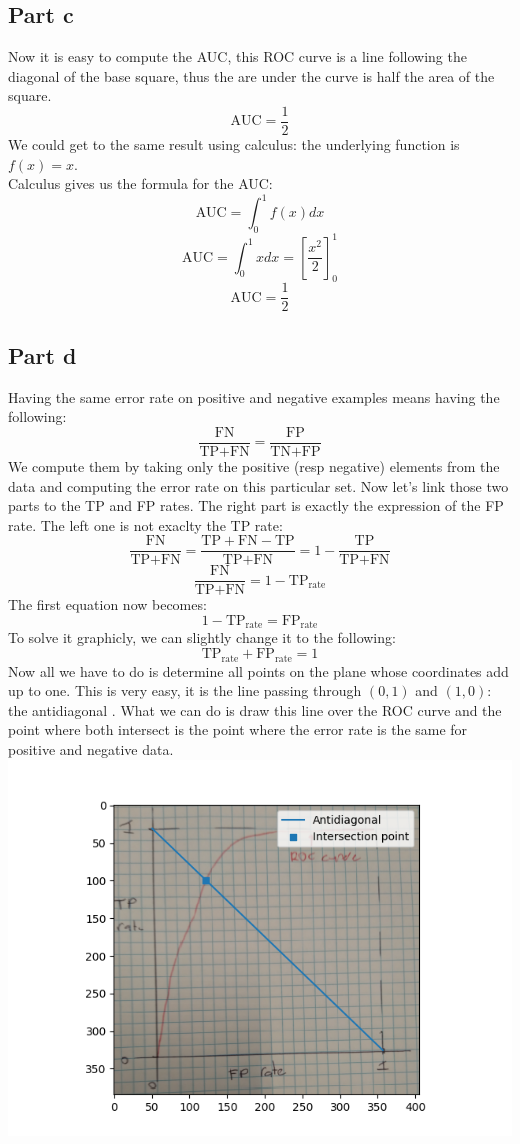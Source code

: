 \documentclass[a4paper, 10pt]{article}
\begin{document}
\subsection{Part c}
Now it is easy to compute the AUC, this ROC curve is a line
following the diagonal of the base square, thus the are under the curve is
half the area of the square.
$$
\text{AUC} = \frac{1}{2}
$$
We could get to the same result using calculus: the underlying function
is $f(x) = x$.
\\
Calculus gives us the formula for the AUC:
$$
\text{AUC} = \int_0^1 f(x) dx
$$
$$
\text{AUC} = \int_0^1 x dx = \left[\frac{x^2}{2} \right]_0^1 
$$
$$
\text{AUC} = \frac{1}{2}
$$

\subsection{Part d}
Having the same error rate on positive and negative examples means having the following:
$$
\frac{\text{FN}}{\text{TP}+\text{FN}} = \frac{\text{FP}}{\text{TN}+\text{FP}}
$$
We compute them by taking only the positive (resp negative) elements from the data
and computing the error rate on this particular set.
Now let's link those two parts to the TP and FP rates. The right part is exactly the expression
of the FP rate. The left one is not exaclty the TP rate:
$$
\frac{\text{FN}}{\text{TP}+\text{FN}} = \frac{\text{TP}+\text{FN} - \text{TP}}{\text{TP}+\text{FN}} = 1 - \frac{\text{TP}}{\text{TP}+\text{FN}}
$$
$$
\frac{\text{FN}}{\text{TP}+\text{FN}} = 1 - \text{TP}_\text{rate}
$$
The first equation now becomes:
$$
1 - \text{TP}_\text{rate} = \text{FP}_\text{rate}
$$
To solve it graphicly, we can slightly change it to the following:
$$
\text{TP}_\text{rate} + \text{FP}_\text{rate} = 1
$$
Now all we have to do is determine all points on the plane whose coordinates add up to one.
This is very easy, it is the line passing through $(0,1)$ and $(1,0)$: the antidiagonal . What we can do is 
draw this line over the ROC curve and the point where both intersect is the point where
the error rate is the same for positive and negative data. 
\\
\includegraphics{ex2d}
\end{document}
